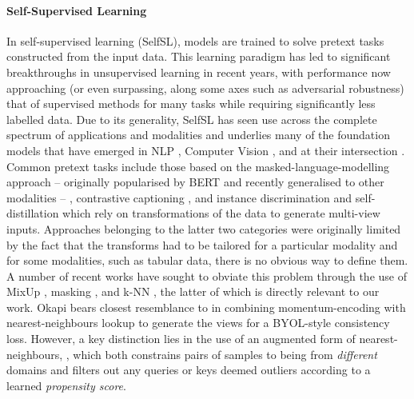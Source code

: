 \paragraph{Self-Supervised Learning} 
In self-supervised learning (SelfSL), models are trained to solve pretext tasks constructed from
the input data.
%
This learning paradigm has led to significant breakthroughs in unsupervised learning in recent
years, with performance now approaching (or even surpassing, along some axes such as adversarial
robustness) that of supervised methods for many tasks while requiring significantly less labelled data.
%
Due to its generality, SelfSL has seen use across the complete spectrum of applications and
modalities and underlies many of the foundation models \citep{bommasani2021opportunities} that have
emerged in NLP \citep{brown2020language, chowdhery2022palm, devlin2018bert}, Computer Vision
\citep{goyal2022vision}, and at their intersection \citep{alayrac2022flamingo, yu2022coca}.
%
Common pretext tasks include those based on the masked-language-modelling approach -- originally
popularised by BERT \citep{devlin2018bert} and recently generalised to other modalities
\citep{baevski2022data2vec, bao2021beit} -- \citep{chen2020simple, he2020momentum}, contrastive
captioning  \citep{radford2021learning, yu2022coca}, and instance discrimination and
self-distillation \citep{caron2021emerging, grill2020bootstrap} which rely on transformations of
the data to generate multi-view inputs.
%
Approaches belonging to the latter two categories were originally limited by the fact that the
transforms had to be tailored for a particular modality and for some modalities, such as tabular
data, there is no obvious way to define them.
%
A number of recent works have sought to obviate this problem through the use of  MixUp
\citep{verma2021towards}, masking \citep{baevski2022data2vec, MaskedAutoencoders2021}, and k-NN
\citep{dwibedi2021little, koohpayegani2021mean, van2021revisiting}, the latter of which is directly
relevant to our work.
%
Okapi bears closest resemblance to \cite{koohpayegani2021mean} in combining momentum-encoding with
nearest-neighbours lookup to generate the views for a BYOL-style \citep{grill2020bootstrap}
consistency loss. 
%
However, a key distinction lies in the use of an augmented form of nearest-neighbours, \CNN, which
both constrains pairs of samples to being from \emph{different} domains and filters out any queries
or keys deemed outliers according to a learned \emph{propensity score}. 

